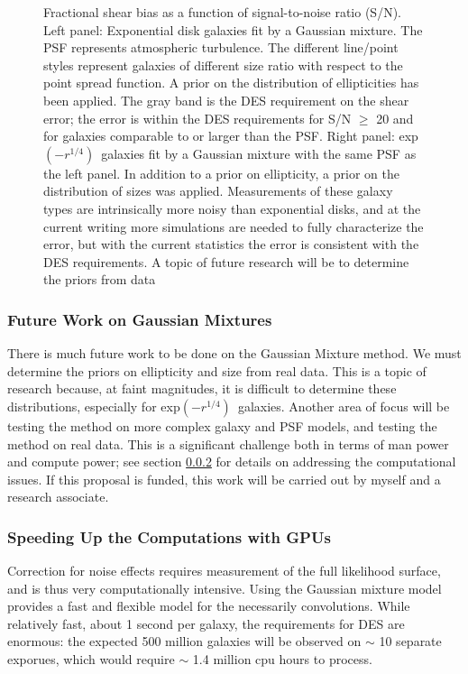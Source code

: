 \documentclass[12pt]{article}
\newcommand{\devprof}{exp$(-r^{1/4})$}
\begin{document}
\begin{figure}[t]
\caption{Fractional shear bias as a function of signal-to-noise ratio (S/N).
Left panel: Exponential disk galaxies fit by a Gaussian mixture.  The PSF
represents atmospheric turbulence.  The different line/point styles represent
galaxies of different size ratio with respect to the point spread function.  A
prior on the distribution of ellipticities has been applied.  The gray band is
the DES requirement on the shear error; the error is within the DES
requirements for S/N $\geq$ 20 and for galaxies comparable to or larger than
the PSF.  Right panel: \devprof\ galaxies fit by a Gaussian mixture with the
same PSF as the left panel. In addition to a prior on ellipticity, a prior on
the distribution of sizes was applied.  Measurements of these galaxy types are
intrinsically more noisy than exponential disks, and at the current writing
more simulations are needed to fully characterize the error, but with the
current statistics the error is consistent with the DES requirements. 
A topic of future research will be to
determine the priors from data 
\label{fig:getgdt}}

\end{figure}

\subsubsection{Future Work on Gaussian Mixtures}

There is much future work to be done on the Gaussian Mixture method.  We must
determine the priors on ellipticity and size from real data.  This is a topic
of research because, at faint magnitudes, it is difficult to determine these
distributions, especially for \devprof\ galaxies\cite{Miller12}.  Another area
of focus will be testing the method on more complex galaxy and PSF models, and
testing the method on real data.  This is a significant challenge both in terms
of man power and compute power; see section \ref{sec:gmix:gpu} for details on
addressing the computational issues.  If this proposal is funded, this work
will be carried out by myself and a research associate.

\subsubsection{Speeding Up the Computations with GPUs} \label{sec:gmix:gpu}

Correction for noise effects requires measurement of the full likelihood
surface, and is thus very computationally intensive.  Using the Gaussian
mixture model provides a fast and flexible model for the necessarily
convolutions.   While relatively fast, about 1 second per galaxy, the
requirements for DES are enormous: the expected 500 million galaxies will be
observed on $\sim$ 10 separate exporues, which would require $\sim$ 1.4 million
cpu hours to process.
\end{document}
